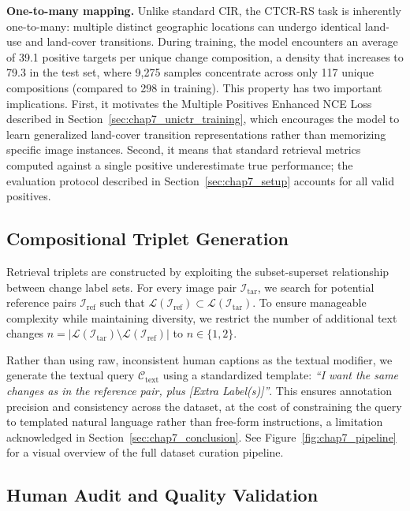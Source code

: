\textbf{One-to-many mapping.} Unlike standard CIR, the
CTCR-RS task is inherently one-to-many: multiple distinct
geographic locations can undergo identical land-use and
land-cover transitions. During training, the model
encounters an average of 39.1 positive targets per unique
change composition, a density that increases to 79.3 in the
test set, where 9,275 samples concentrate across only 117
unique compositions (compared to 298 in training). This
property has two important implications. First, it motivates
the Multiple Positives Enhanced NCE Loss described in
Section~\ref{sec:chap7_unictr_training}, which encourages
the model to learn generalized land-cover transition
representations rather than memorizing specific image
instances. Second, it means that standard retrieval metrics
computed against a single positive underestimate true
performance; the evaluation protocol described in
Section~\ref{sec:chap7_setup} accounts for all valid
positives.
 
\subsection{Compositional Triplet Generation}
\label{sec:chap7_triplets}
 
Retrieval triplets are constructed by exploiting the
subset-superset relationship between change label sets.
For every image pair $\mathcal{I}_\text{tar}$, we search
for potential reference pairs $\mathcal{I}_\text{ref}$
such that $\mathcal{L}(\mathcal{I}_\text{ref}) \subset
\mathcal{L}(\mathcal{I}_\text{tar})$. To ensure manageable
complexity while maintaining diversity, we restrict the
number of additional text changes
$n = |\mathcal{L}(\mathcal{I}_\text{tar}) \setminus
\mathcal{L}(\mathcal{I}_\text{ref})|$ to $n \in \{1, 2\}$.
 
Rather than using raw, inconsistent human captions as the
textual modifier, we generate the textual query
$\mathcal{C}_\text{text}$ using a standardized template:
\textit{``I want the same changes as in the reference pair,
plus [Extra Label(s)]''}. This ensures annotation precision
and consistency across the dataset, at the cost of
constraining the query to templated natural language rather
than free-form instructions, a limitation acknowledged
in Section~\ref{sec:chap7_conclusion}.
See Figure~\ref{fig:chap7_pipeline} for a visual overview of
the full dataset curation pipeline.

\subsection{Human Audit and Quality Validation}
\label{sec:chap7_audit}
 
